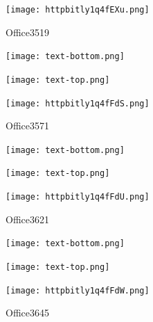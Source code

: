 \documentclass[letterpaper]{article}
\begin{document}
 \begingroup 
 \centerline{\texttt{[image: httpbitly1q4fEXu.png]}} 
 \endgroup 
 \vspace*{\fill} 

 \hfill{\small Office3519} 

  \vspace{0.7in} 
 
 \centerline{\texttt{[image: text-bottom.png]}} 
 
 \pagebreak 
{} 
 \vspace*{\fill} 
 
  \centerline{\texttt{[image: text-top.png]}} 
 
 \vspace{0.5in} 
 
 \begingroup 
 \centerline{\texttt{[image: httpbitly1q4fFdS.png]}} 
 \endgroup 
 \vspace*{\fill} 

 \hfill{\small Office3571} 

  \vspace{0.7in} 
 
 \centerline{\texttt{[image: text-bottom.png]}} 
 
 \pagebreak 
{} 
 \vspace*{\fill} 
 
  \centerline{\texttt{[image: text-top.png]}} 
 
 \vspace{0.5in} 
 
 \begingroup 
 \centerline{\texttt{[image: httpbitly1q4fFdU.png]}} 
 \endgroup 
 \vspace*{\fill} 

 \hfill{\small Office3621} 

  \vspace{0.7in} 
 
 \centerline{\texttt{[image: text-bottom.png]}} 
 
 \pagebreak 
{} 
 \vspace*{\fill} 
 
  \centerline{\texttt{[image: text-top.png]}} 
 
 \vspace{0.5in} 
 
 \begingroup 
 \centerline{\texttt{[image: httpbitly1q4fFdW.png]}} 
 \endgroup 
 \vspace*{\fill} 

 \hfill{\small Office3645} 

  \vspace{0.7in} 
 
\end{document}
